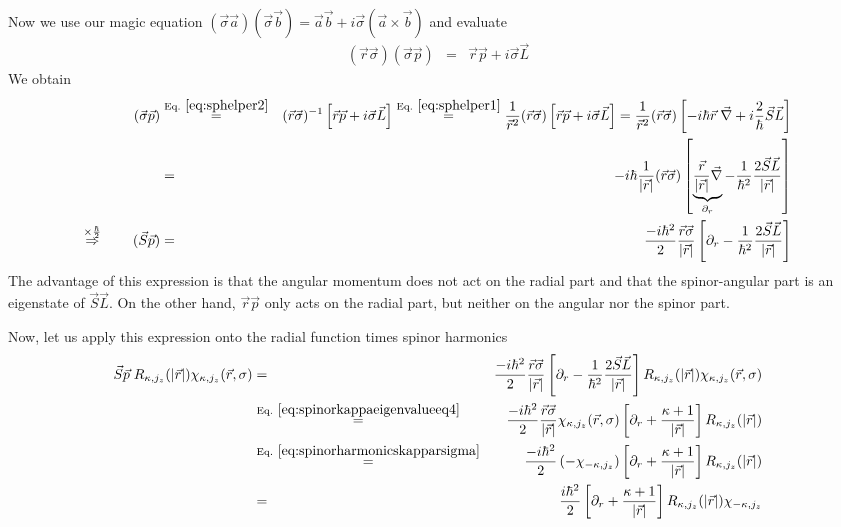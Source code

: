 \documentclass[11pt,a4paper]{report}
\begin{document}
Now we use our magic equation
$(\vec{\sigma}\vec{a})(\vec{\sigma}\vec{b})=\vec{a}\vec{b}+i\vec{\sigma}(\vec{a}\times\vec{b})$
and evaluate
\begin{eqnarray}
(\vec{r}\vec{\sigma})(\vec{\sigma}\vec{p})&=&\vec{r}\vec{p}+i\vec{\sigma}\vec{L}
\label{eq:sphelper2}
\end{eqnarray}
We obtain
\begin{eqnarray*}
(\vec{\sigma}\vec{p})
&\eqrel{eq:sphelper2}{=}&
(\vec{r}\vec{\sigma})^{-1}\left[\vec{r}\vec{p}+i\vec{\sigma}\vec{L}\right]
%
\eqrel{eq:sphelper1}{=}
\frac{1}{\vec{r}^2}(\vec{r}\vec{\sigma})
\left[\vec{r}\vec{p}+i\vec{\sigma}\vec{L}\right]
%
=\frac{1}{\vec{r}^2}(\vec{r}\vec{\sigma})
\left[-i\hbar\vec{r}\;\vec{\nabla}+i\frac{2}{\hbar}\vec{S}\vec{L}\right]
\\
&=&
-i\hbar\frac{1}{|\vec{r}|}(\vec{r}\vec{\sigma})
\left[\underbrace{\frac{\vec{r}}{|\vec{r}|}\vec{\nabla}}_{\partial_r}
-\frac{1}{\hbar^2}\frac{2\vec{S}\vec{L}}{|\vec{r}|}\right]
\\
\stackrel{\times\frac{\hbar}{2}}{\Rightarrow}\qquad
(\vec{S}\vec{p})
&=&
\frac{-i\hbar^2}{2}
\frac{\vec{r}\vec{\sigma}}{|\vec{r}|} 
\left[\partial_r-\frac{1}{\hbar^2}\frac{2\vec{S}\vec{L}}{|\vec{r}|}\right]
\end{eqnarray*}
The advantage of this expression is that the angular momentum does not
act on the radial part and that the spinor-angular part is an
eigenstate of $\vec{S}\vec{L}$. On the other hand, $\vec{r}\vec{p}$
only acts on the radial part, but neither on the angular nor the
spinor part.

Now, let us apply this expression onto the radial function times spinor
harmonics
\begin{eqnarray}
\vec{S}\vec{p}\; R_{\kappa,j_z}(|\vec{r}|)\chi_{\kappa,j_z}(\vec{r},\sigma)
&=&
\frac{-i\hbar^2}{2}
\frac{\vec{r}\vec{\sigma}}{|\vec{r}|} 
\left[\partial_r-\frac{1}{\hbar^2}\frac{2\vec{S}\vec{L}}{|\vec{r}|}\right]
R_{\kappa,j_z}(|\vec{r}|)\chi_{\kappa,j_z}(\vec{r},\sigma)
\nonumber\\
&\eqrel{eq:spinorkappaeigenvalueeq4}{=}&
\frac{-i\hbar^2}{2}
\frac{\vec{r}\vec{\sigma}}{|\vec{r}|} \chi_{\kappa,j_z}(\vec{r},\sigma)
\left[\partial_r+\frac{\kappa+1}{|\vec{r}|}\right]
R_{\kappa,j_z}(|\vec{r}|)
\nonumber\\
&\eqrel{eq:spinorharmonicskapparsigma}{=}&
\frac{-i\hbar^2}{2}
\left(- \chi_{-\kappa,j_z}\right)
\left[\partial_r+\frac{\kappa+1}{|\vec{r}|}\right]
R_{\kappa,j_z}(|\vec{r}|)
\nonumber\\
&=&
\frac{i\hbar^2}{2}
\left[\partial_r+\frac{\kappa+1}{|\vec{r}|}\right]
R_{\kappa,j_z}(|\vec{r}|)\chi_{-\kappa,j_z}
\label{eq:spwithkappa}
\end{eqnarray}
\end{document}
